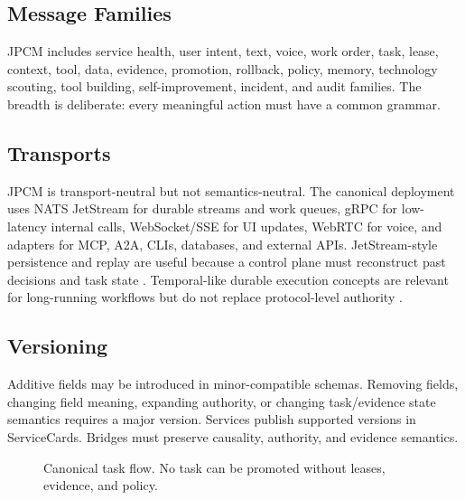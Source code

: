 \documentclass[10pt,journal,onecolumn]{IEEEtran}
\begin{document}
\subsection{Message Families}
JPCM includes service health, user intent, text, voice, work order, task, lease, context, tool, data, evidence, promotion, rollback, policy, memory, technology scouting, tool building, self-improvement, incident, and audit families. The breadth is deliberate: every meaningful action must have a common grammar.

\subsection{Transports}
JPCM is transport-neutral but not semantics-neutral. The canonical deployment uses NATS JetStream for durable streams and work queues, gRPC for low-latency internal calls, WebSocket/SSE for UI updates, WebRTC for voice, and adapters for MCP, A2A, CLIs, databases, and external APIs. JetStream-style persistence and replay are useful because a control plane must reconstruct past decisions and task state \cite{nats}. Temporal-like durable execution concepts are relevant for long-running workflows but do not replace protocol-level authority \cite{temporal}.

\subsection{Versioning}
Additive fields may be introduced in minor-compatible schemas. Removing fields, changing field meaning, expanding authority, or changing task/evidence state semantics requires a major version. Services publish supported versions in ServiceCards. Bridges must preserve causality, authority, and evidence semantics.


\begin{figure}[t]
\centering
{}
\caption{Canonical task flow. No task can be promoted without leases, evidence, and policy.}
\label{fig:task}
\end{figure}
\end{document}
